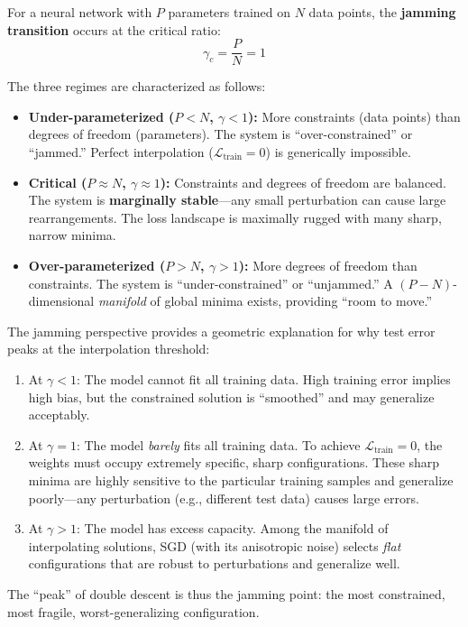 \documentclass[
  journal=largetwo,
  year=2025,
  volume=37,
]{cup-journal}
\begin{document}
\begin{definition}\label{def:jamming_nn}
For a neural network with $P$ parameters trained on $N$ data points, the \textbf{jamming transition} occurs at the critical ratio:
\begin{equation}
    \gamma_c = \frac{P}{N} = 1
\end{equation}

The three regimes are characterized as follows:
\begin{itemize}
    \item \textbf{Under-parameterized ($P < N$, $\gamma < 1$):} More constraints (data points) than degrees of freedom (parameters). The system is ``over-constrained'' or ``jammed.'' Perfect interpolation ($\mathcal{L}_{\text{train}} = 0$) is generically impossible.
    
    \item \textbf{Critical ($P \approx N$, $\gamma \approx 1$):} Constraints and degrees of freedom are balanced. The system is \textbf{marginally stable}---any small perturbation can cause large rearrangements. The loss landscape is maximally rugged with many sharp, narrow minima.
    
    \item \textbf{Over-parameterized ($P > N$, $\gamma > 1$):} More degrees of freedom than constraints. The system is ``under-constrained'' or ``unjammed.'' A $(P - N)$-dimensional \textit{manifold} of global minima exists, providing ``room to move.''
\end{itemize}
\end{definition}

\begin{remark}
The jamming perspective provides a geometric explanation for why test error peaks at the interpolation threshold:

\begin{enumerate}
    \item At $\gamma < 1$: The model cannot fit all training data. High training error implies high bias, but the constrained solution is ``smoothed'' and may generalize acceptably.
    
    \item At $\gamma = 1$: The model \textit{barely} fits all training data. To achieve $\mathcal{L}_{\text{train}} = 0$, the weights must occupy extremely specific, sharp configurations. These sharp minima are highly sensitive to the particular training samples and generalize poorly---any perturbation (e.g., different test data) causes large errors.
    
    \item At $\gamma > 1$: The model has excess capacity. Among the manifold of interpolating solutions, SGD (with its anisotropic noise) selects \textit{flat} configurations that are robust to perturbations and generalize well.
\end{enumerate}

The ``peak'' of double descent is thus the jamming point: the most constrained, most fragile, worst-generalizing configuration.
\end{remark}
\end{document}
